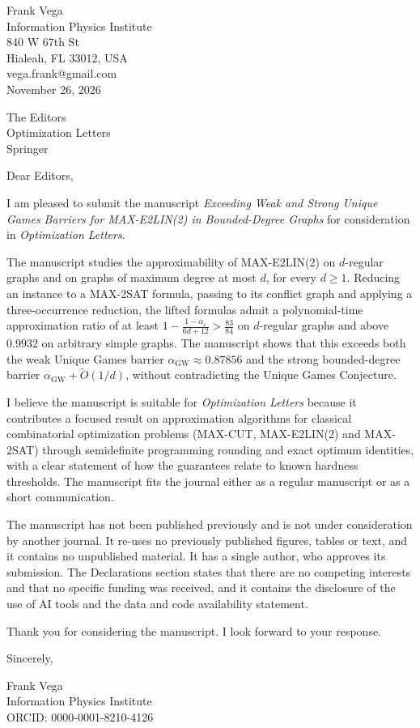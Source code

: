 \documentclass[11pt]{article}
\begin{document}
\begin{flushright}
Frank Vega\\
Information Physics Institute\\
840 W 67th St\\
Hialeah, FL 33012, USA\\
vega.frank@gmail.com\\[1em]
November 26, 2026
\end{flushright}

The Editors\\
Optimization Letters\\
Springer

Dear Editors,

I am pleased to submit the manuscript \emph{Exceeding Weak and Strong Unique Games Barriers for MAX-E2LIN(2) in Bounded-Degree Graphs} for consideration in \emph{Optimization Letters}.

The manuscript studies the approximability of MAX-E2LIN(2) on $d$-regular graphs and on graphs of maximum degree at most $d$, for every $d \ge 1$. Reducing an instance to a MAX-2SAT formula, passing to its conflict graph and applying a three-occurrence reduction, the lifted formulas admit a polynomial-time approximation ratio of at least $1 - \frac{1-\alpha_\varepsilon}{6d+12} > \frac{83}{84}$ on $d$-regular graphs and above $0.9932$ on arbitrary simple graphs. The manuscript shows that this exceeds both the weak Unique Games barrier $\alpha_{\mathrm{GW}} \approx 0.87856$ and the strong bounded-degree barrier $\alpha_{\mathrm{GW}} + \widetilde{O}(1/d)$, without contradicting the Unique Games Conjecture.

I believe the manuscript is suitable for \emph{Optimization Letters} because it contributes a focused result on approximation algorithms for classical combinatorial optimization problems (MAX-CUT, MAX-E2LIN(2) and MAX-2SAT) through semidefinite programming rounding and exact optimum identities, with a clear statement of how the guarantees relate to known hardness thresholds. The manuscript fits the journal either as a regular manuscript or as a short communication.

The manuscript has not been published previously and is not under consideration by another journal. It re-uses no previously published figures, tables or text, and it contains no unpublished material. It has a single author, who approves its submission. The Declarations section states that there are no competing interests and that no specific funding was received, and it contains the disclosure of the use of AI tools and the data and code availability statement.

Thank you for considering the manuscript. I look forward to your response.

Sincerely,

Frank Vega\\
Information Physics Institute\\
ORCID: 0000-0001-8210-4126
\end{document}
